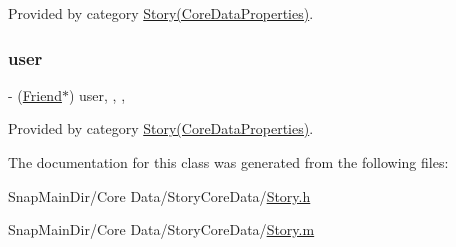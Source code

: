 Provided by category \hyperlink{category_story_07_core_data_properties_08_a4616dbf24fe3c6c6f5482aea92cedd57}{Story(\+Core\+Data\+Properties)}.

\hypertarget{interface_story_a121feaf5c67f45ee0541af06a20407af}{}\label{interface_story_a121feaf5c67f45ee0541af06a20407af} 
\subsubsection{\texorpdfstring{user}{user}}
{\footnotesize\ttfamily -\/ (\hyperlink{interface_friend}{Friend}$\ast$) user\hspace{0.3cm}{\ttfamily [read]}, {\ttfamily [write]}, {\ttfamily [nonatomic]}, {\ttfamily [retain]}}



Provided by category \hyperlink{category_story_07_core_data_properties_08_a121feaf5c67f45ee0541af06a20407af}{Story(\+Core\+Data\+Properties)}.



The documentation for this class was generated from the following files\+:\begin{DoxyCompactItemize}
\item 
Snap\+Main\+Dir/\+Core Data/\+Story\+Core\+Data/\hyperlink{_story_8h}{Story.\+h}\item 
Snap\+Main\+Dir/\+Core Data/\+Story\+Core\+Data/\hyperlink{_story_8m}{Story.\+m}\end{DoxyCompactItemize}
